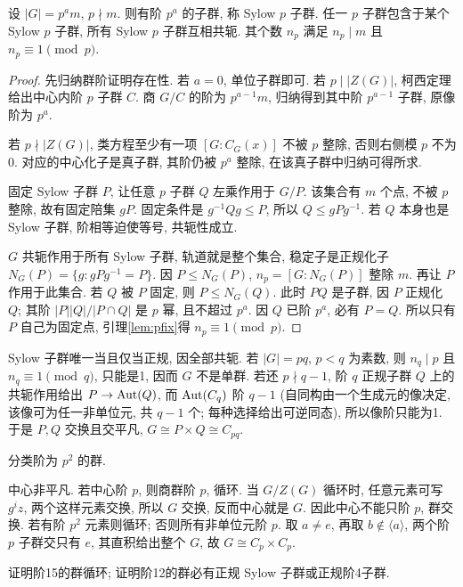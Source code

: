 \begin{theorem}[Sylow]\label{thm:sylow}
设 $|G|=p^am$, $p\nmid m$. 则有阶 $p^a$ 的子群, 称 Sylow $p$ 子群. 任一 $p$ 子群包含于某个 Sylow $p$ 子群, 所有 Sylow $p$ 子群互相共轭. 其个数 $n_p$ 满足 $n_p\mid m$ 且 $n_p\equiv1\pmod p$.
\end{theorem}
\begin{proof}
先归纳群阶证明存在性. 若 $a=0$, 单位子群即可. 若 $p\mid|Z(G)|$, 柯西定理给出中心内阶 $p$ 子群 $C$. 商 $G/C$ 的阶为 $p^{a-1}m$, 归纳得到其中阶 $p^{a-1}$ 子群, 原像阶为 $p^a$.

若 $p\nmid|Z(G)|$, 类方程至少有一项 $[G:C_G(x)]$ 不被 $p$ 整除, 否则右侧模 $p$ 不为0. 对应的中心化子是真子群, 其阶仍被 $p^a$ 整除, 在该真子群中归纳可得所求.

固定 Sylow 子群 $P$, 让任意 $p$ 子群 $Q$ 左乘作用于 $G/P$. 该集合有 $m$ 个点, 不被 $p$ 整除, 故有固定陪集 $gP$. 固定条件是 $g^{-1}Qg\le P$, 所以 $Q\le gPg^{-1}$. 若 $Q$ 本身也是 Sylow 子群, 阶相等迫使等号, 共轭性成立.

$G$ 共轭作用于所有 Sylow 子群, 轨道就是整个集合, 稳定子是正规化子 $N_G(P)=\{g:gPg^{-1}=P\}$. 因 $P\le N_G(P)$, $n_p=[G:N_G(P)]$ 整除 $m$. 再让 $P$ 作用于此集合. 若 $Q$ 被 $P$ 固定, 则 $P\le N_G(Q)$. 此时 $PQ$ 是子群, 因 $P$ 正规化 $Q$; 其阶 $|P||Q|/|P\cap Q|$ 是 $p$ 幂, 且不超过 $p^a$. 因 $Q$ 已阶 $p^a$, 必有 $P=Q$. 所以只有 $P$ 自己为固定点, 引理\ref{lem:pfix}得 $n_p\equiv1\pmod p$.
\end{proof}
Sylow 子群唯一当且仅当正规, 因全部共轭. 若 $|G|=pq$, $p<q$ 为素数, 则 $n_q\mid p$ 且 $n_q\equiv1\pmod q$, 只能是1, 因而 $G$ 不是单群. 若还 $p\nmid q-1$, 阶 $q$ 正规子群 $Q$ 上的共轭作用给出 $P\to\operatorname{Aut}(Q)$, 而 $\operatorname{Aut}(C_q)$ 阶 $q-1$ (自同构由一个生成元的像决定, 该像可为任一非单位元, 共 $q-1$ 个; 每种选择给出可逆同态), 所以像阶只能为1. 于是 $P,Q$ 交换且交平凡, $G\cong P\times Q\cong C_{pq}$.
\begin{example}分类阶为 $p^2$ 的群.\end{example}
\begin{solution}
中心非平凡. 若中心阶 $p$, 则商群阶 $p$, 循环. 当 $G/Z(G)$ 循环时, 任意元素可写 $g^iz$, 两个这样元素交换, 所以 $G$ 交换, 反而中心就是 $G$. 因此中心不能只阶 $p$, 群交换. 若有阶 $p^2$ 元素则循环; 否则所有非单位元阶 $p$. 取 $a\ne e$, 再取 $b\notin\langle a\rangle$, 两个阶 $p$ 子群交只有 $e$, 其直积给出整个 $G$, 故 $G\cong C_p\times C_p$.
\end{solution}
\begin{exercise}证明阶15的群循环; 证明阶12的群必有正规 Sylow 子群或正规阶4子群.\end{exercise}
